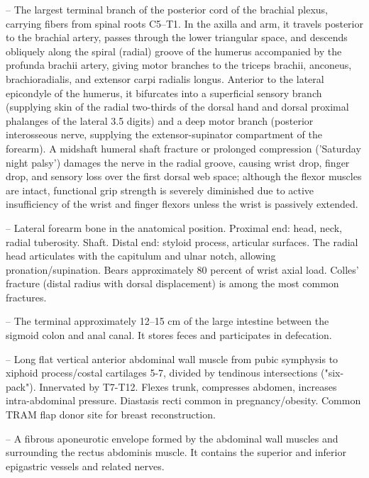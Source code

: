 -- The largest terminal branch of the posterior cord of the brachial plexus, carrying fibers from spinal roots C5--T1. In the axilla and arm, it travels posterior to the brachial artery, passes through the lower triangular space, and descends obliquely along the spiral (radial) groove of the humerus accompanied by the profunda brachii artery, giving motor branches to the triceps brachii, anconeus, brachioradialis, and extensor carpi radialis longus. Anterior to the lateral epicondyle of the humerus, it bifurcates into a superficial sensory branch (supplying skin of the radial two-thirds of the dorsal hand and dorsal proximal phalanges of the lateral 3.5 digits) and a deep motor branch (posterior interosseous nerve, supplying the extensor-supinator compartment of the forearm). A midshaft humeral shaft fracture or prolonged compression ('Saturday night palsy') damages the nerve in the radial groove, causing wrist drop, finger drop, and sensory loss over the first dorsal web space; although the flexor muscles are intact, functional grip strength is severely diminished due to active insufficiency of the wrist and finger flexors unless the wrist is passively extended.

-- Lateral forearm bone in the anatomical position. Proximal end: head, neck, radial tuberosity. Shaft. Distal end: styloid process, articular surfaces. The radial head articulates with the capitulum and ulnar notch, allowing pronation/supination. Bears approximately 80 percent of wrist axial load. Colles' fracture (distal radius with dorsal displacement) is among the most common fractures.

-- The terminal approximately 12--15 cm of the large intestine between the sigmoid colon and anal canal. It stores feces and participates in defecation.

-- Long flat vertical anterior abdominal wall muscle from pubic symphysis to xiphoid process/costal cartilages 5-7, divided by tendinous intersections ("six-pack"). Innervated by T7-T12. Flexes trunk, compresses abdomen, increases intra-abdominal pressure. Diastasis recti common in pregnancy/obesity. Common TRAM flap donor site for breast reconstruction.

-- A fibrous aponeurotic envelope formed by the abdominal wall muscles and surrounding the rectus abdominis muscle. It contains the superior and inferior epigastric vessels and related nerves.

